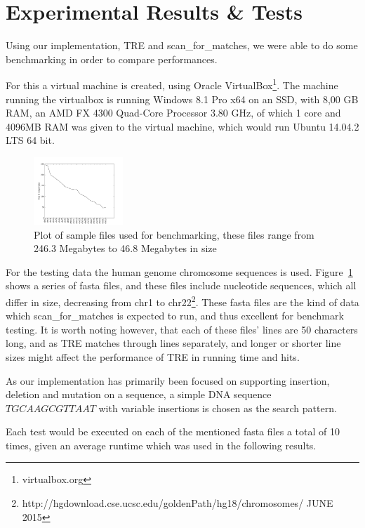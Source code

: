 \section{Experimental Results \& Tests}
Using our implementation, TRE and scan\_for\_matches, we were able to do some benchmarking in order to compare performances.

For this a virtual machine is created, using Oracle VirtualBox\footnote{virtualbox.org}. The machine running the virtualbox is running Windows 8.1 Pro x64 on an SSD, with 8,00 GB RAM, an AMD FX 4300 Quad-Core Processor 3.80 GHz, of which 1 core and 4096MB RAM was given to the virtual machine, which would run Ubuntu 14.04.2 LTS 64 bit.

\begin{figure}
\centering
\includegraphics[width=0.3\textwidth]{Benchmarking/size.png}
\caption{Plot of sample files used for benchmarking, these files range from 246.3 Megabytes to 46.8 Megabytes in size}
\label{fig:size}
\end{figure}

For the testing data the human genome chromosome sequences is used. Figure~\ref{fig:size} shows a series of fasta files, and these files include nucleotide sequences, which all differ in size, decreasing from chr1 to chr22\footnote{http://hgdownload.cse.ucsc.edu/goldenPath/hg18/chromosomes/ JUNE 2015}. These fasta files are the kind of data which scan\_for\_matches is expected to run, and thus excellent for benchmark testing. It is worth noting however, that each of these files' lines are 50 characters long, and as TRE matches through lines separately, and longer or shorter line sizes might affect the performance of TRE in running time and hits.%

As our implementation has primarily been focused on supporting insertion, deletion and mutation on a sequence, a simple DNA sequence $TGCAAGCGTTAAT$ with variable insertions is chosen as the search pattern.

Each test would be executed on each of the mentioned fasta files a total of 10 times, given an average runtime which was used in the following results.

